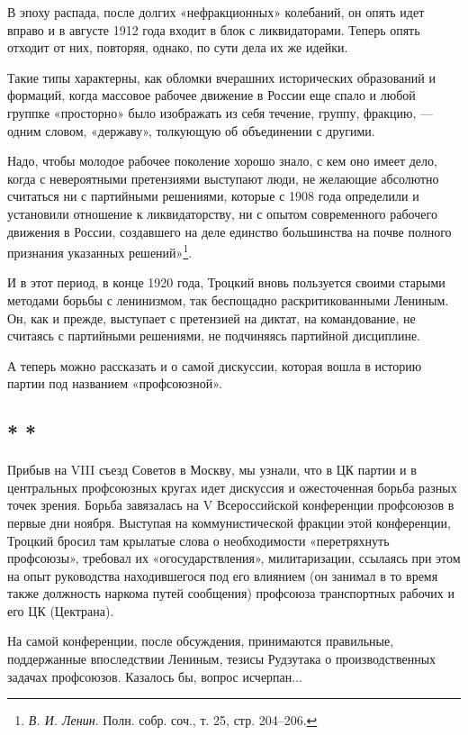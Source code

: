 \documentclass[12pt, a4paper, openany]{book}
\begin{document}
В эпоху распада, после долгих «нефракционных» колебаний, он опять идет вправо и в августе 1912 года входит в блок с ликвидаторами. Теперь опять отходит от них, повторяя, однако, по сути дела их же идейки.

Такие типы характерны, как обломки вчерашних исторических образований и формаций, когда массовое рабочее движение в России еще спало и любой группке «просторно» было изображать из себя течение, группу, фракцию, — одним словом, «державу», толкующую об объединении с другими.

Надо, чтобы молодое рабочее поколение хорошо знало, с кем оно имеет дело, когда с невероятными претензиями выступают люди, не желающие абсолютно считаться ни с партийными решениями, которые с 1908 года определили и установили отношение к ликвидаторству, ни с опытом современного рабочего движения в России, создавшего на деле единство большинства на почве полного признания указанных решений»\footnote{\textit{В. И. Ленин}. Полн. собр. соч., т. 25, стр. 204–206.}.

И в этот период, в конце 1920 года, Троцкий вновь пользуется своими старыми методами борьбы с ленинизмом, так беспощадно раскритикованными Лениным. Он, как и прежде, выступает с претензией на диктат, на командование, не считаясь с партийными решениями, не подчиняясь партийной дисциплине.

А теперь можно рассказать и о самой дискуссии, которая вошла в историю партии под названием «профсоюзной».

\subsection*{\center * * *}

Прибыв на VIII съезд Советов в Москву, мы узнали, что в ЦК партии и в центральных профсоюзных кругах идет дискуссия и ожесточенная борьба разных точек зрения. Борьба завязалась на V Всероссийской конференции профсоюзов в первые дни ноября. Выступая на коммунистической фракции этой конференции, Троцкий бросил там крылатые слова о необходимости «перетряхнуть профсоюзы», требовал их «огосударствления», милитаризации, ссылаясь при этом на опыт руководства находившегося под его влиянием (он занимал в то время также должность наркома путей сообщения) профсоюза транспортных рабочих и его ЦК (Цектрана).

На самой конференции, после обсуждения, принимаются правильные, поддержанные впоследствии Лениным, тезисы Рудзутака о производственных задачах профсоюзов. Казалось бы, вопрос исчерпан...
\end{document}
